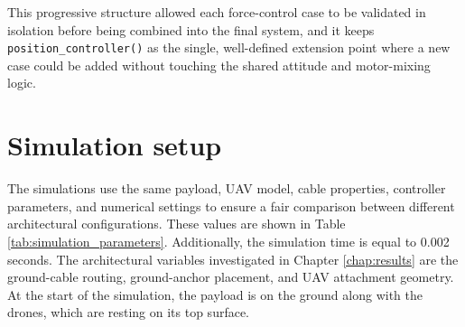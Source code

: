This progressive structure allowed each force-control case to be validated in isolation before being combined into the final system, and it keeps \texttt{position\_controller()} as the single, well-defined extension point where a new case could be added without touching the shared attitude and motor-mixing logic.

\section{Simulation setup}
The simulations use the same payload, UAV model, cable properties, controller parameters, and numerical settings to ensure a fair comparison between different architectural configurations. These values are shown in Table \ref{tab:simulation_parameters}. Additionally, the simulation time is equal to 0.002 seconds. 
The architectural variables investigated in Chapter \ref{chap:results} are the ground-cable routing, ground-anchor placement, and UAV attachment geometry. At the start of the simulation, the payload is on the ground along with the drones, which are resting on its top surface.

